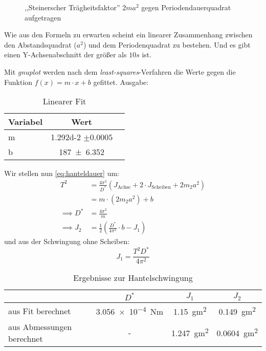 \begin{figure}[H]
  \centering
  \caption{,,Steinerscher Trägheitsfaktor'' $2ma^2$ gegen Periodendauerquadrat aufgetragen}
  \label{fig:durchbiegung}
\end{figure}
Wie aus den Formeln zu erwarten scheint ein linearer Zusammenhang zwischen den Abstandsquadrat ($a^2$) und dem Periodenquadrat zu bestehen. Und es gibt einen Y-Achsenabschnitt der größer als $10s$ ist.

Mit \emph{gnuplot} werden nach dem \emph{least-squares}-Verfahren die Werte gegen die Funktion $f(x)=m\cdot x+b$ gefittet. Ausgabe:

\begin{table}[H]
  \centering
  \begin{tabular}{l | c | c}
    Variabel & Wert \\ \hline
    m & \num{1.292d-2} $\pm 0.0005$ \\
    b & \num{187\pm 6.352} 
  \end{tabular}
  \caption{Linearer Fit}
  \label{tab:durchbiegungsfit}
\end{table}

Wir stellen nun \cref{eq:hanteldauer} um:
\begin{align}
  T^2&=\frac{4\pi^2}{D^*}(J_{\text{Achse}}+2\cdot J_{\text{Scheiben}}+2m_2a^2) \\
  &=m\cdot (2m_2 a^2)+b \\
  \implies D^*&=\frac{4\pi^2}{m} \\
  \implies J_2 &=\frac{1}{2}\left(\frac{D^*}{4 \pi^2}\cdot b - J_1\right)
  \label{eq:hantelergebnis}
\end{align}
und aus der Schwingung ohne Scheiben:
\begin{equation}
  J_1 = \frac{T^2 D^*}{4 \pi^2}
  \label{eq:hantelohnescheibe}
\end{equation}
\begin{table}[H]
  \centering
  \begin{tabular}{l | c | c | c}
    &$D^*$ & $J_1$ & $J_2$ \\ \hline
    aus Fit berechnet & \SI{3.056e-4}{Nm} & \SI{1.15}{gm^2} & \SI{0.149}{gm^2} \\
    aus Abmessungen berechnet & - & \SI{1.247}{gm^2} & \SI{0.0604}{gm^2}
  \end{tabular}
  \caption{Ergebnisse zur Hantelschwingung}
  \label{tab:hantelergebnisse}
\end{table}
